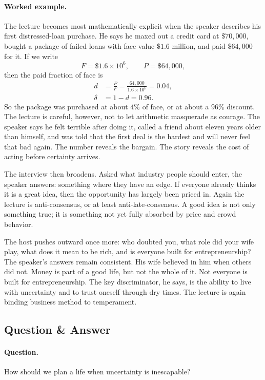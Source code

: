 \paragraph{Worked example.} The lecture becomes most mathematically explicit when the speaker describes his first distressed-loan purchase. He says he maxed out a credit card at \(\$70{,}000\), bought a package of failed loans with face value \(\$1.6\) million, and paid \(\$64{,}000\) for it. If we write
\[
F=\$1.6\times 10^6,
\qquad
P=\$64{,}000,
\]
then the paid fraction of face is
\begin{align}
d &= \frac{P}{F}
   = \frac{64{,}000}{1.6\times 10^6}
   = 0.04,\\
\delta &= 1-d = 0.96.
\end{align}
So the package was purchased at about \(4\%\) of face, or at about a \(96\%\) discount. The lecture is careful, however, not to let arithmetic masquerade as courage. The speaker says he felt terrible after doing it, called a friend about eleven years older than himself, and was told that the first deal is the hardest and will never feel that bad again. The number reveals the bargain. The story reveals the cost of acting before certainty arrives.

The interview then broadens. Asked what industry people should enter, the speaker answers: something where they have an edge. If everyone already thinks it is a great idea, then the opportunity has largely been priced in. Again the lecture is anti-consensus, or at least anti-late-consensus. A good idea is not only something true; it is something not yet fully absorbed by price and crowd behavior.

The host pushes outward once more: who doubted you, what role did your wife play, what does it mean to be rich, and is everyone built for entrepreneurship? The speaker's answers remain consistent. His wife believed in him when others did not. Money is part of a good life, but not the whole of it. Not everyone is built for entrepreneurship. The key discriminator, he says, is the ability to live with uncertainty and to trust oneself through dry times. The lecture is again binding business method to temperament.

\subsection{Question \& Answer}

\paragraph{Question.} How should we plan a life when uncertainty is inescapable?

